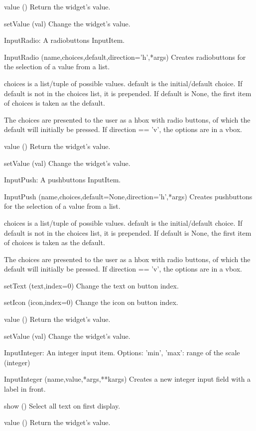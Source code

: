 value ()
Return the widget's value.

setValue (val)
Change the widget's value.

InputRadio: A radiobuttons InputItem.

InputRadio (name,choices,default,direction='h',*args)
Creates radiobuttons for the selection of a value from a list.

        choices is a list/tuple of possible values.
        default is the initial/default choice.
        If default is not in the choices list, it is prepended.
        If default is None, the first item of choices is taken as the default.
       
        The choices are presented to the user as a hbox with radio buttons,
        of which the default will initially be pressed.
        If direction == 'v', the options are in a vbox. 
        

value ()
Return the widget's value.

setValue (val)
Change the widget's value.

InputPush: A pushbuttons InputItem.

InputPush (name,choices,default=None,direction='h',*args)
Creates pushbuttons for the selection of a value from a list.

        choices is a list/tuple of possible values.
        default is the initial/default choice.
        If default is not in the choices list, it is prepended.
        If default is None, the first item of choices is taken as the default.
       
        The choices are presented to the user as a hbox with radio buttons,
        of which the default will initially be pressed.
        If direction == 'v', the options are in a vbox. 
        

setText (text,index=0)
Change the text on button index.

setIcon (icon,index=0)
Change the icon on button index.

value ()
Return the widget's value.

setValue (val)
Change the widget's value.

InputInteger: An integer input item.
    Options:
    'min', 'max': range of the scale (integer)
    
InputInteger (name,value,*args,**kargs)
Creates a new integer input field with a label in front.

show ()
Select all text on first display.

value ()
Return the widget's value.


